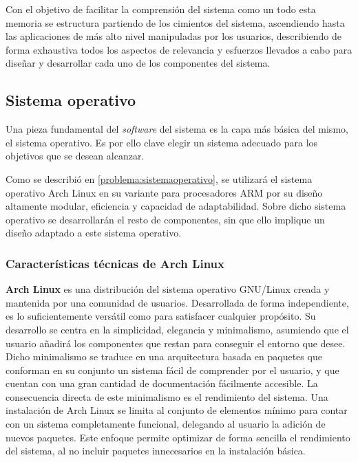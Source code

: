 Con el objetivo de facilitar la comprensión del sistema como un todo esta memoria se estructura partiendo de los cimientos del sistema, ascendiendo hasta las aplicaciones de más alto nivel manipuladas por los usuarios, describiendo de forma exhaustiva todos los aspectos de relevancia y esfuerzos llevados a cabo para diseñar y desarrollar cada uno de los componentes del sistema.

\subsection{Sistema operativo}

Una pieza fundamental del \textit{software} del sistema es la capa más básica del mismo, el sistema operativo. Es por ello clave elegir un sistema adecuado para los objetivos que se desean alcanzar.

Como se describió en \ref{problema:sistemaoperativo}, se utilizará el sistema operativo Arch Linux en su variante para procesadores ARM por su diseño altamente modular, eficiencia y capacidad de adaptabilidad. Sobre dicho sistema operativo se desarrollarán el resto de componentes, sin que ello implique un diseño adaptado a este sistema operativo.

\subsubsection{Características técnicas de Arch Linux}
\label{archlinux:description}

\textbf{Arch Linux} es una distribución del sistema operativo GNU/Linux creada y mantenida por una comunidad de usuarios. Desarrollada de forma independiente, es lo suficientemente versátil como para satisfacer cualquier propósito. Su desarrollo se centra en la simplicidad, elegancia y minimalismo, asumiendo que el usuario añadirá los componentes que restan para conseguir el entorno que desee. Dicho minimalismo se traduce en una arquitectura basada en paquetes que conforman en su conjunto un sistema fácil de comprender por el usuario, y que cuentan con una gran cantidad de documentación fácilmente accesible. La consecuencia directa de este minimalismo es el rendimiento del sistema. Una instalación de Arch Linux se limita al conjunto de elementos mínimo para contar con un sistema completamente funcional, delegando al usuario la adición de nuevos paquetes. Este enfoque permite optimizar de forma sencilla el rendimiento del sistema, al no incluir paquetes innecesarios en la instalación básica.

